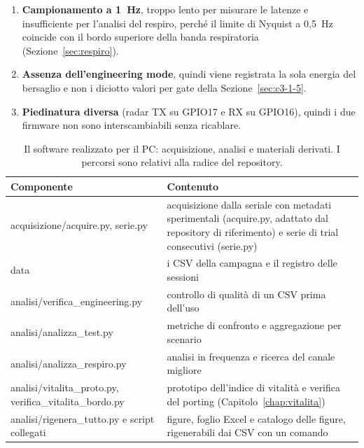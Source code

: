 \begin{enumerate}
  \item \textbf{Campionamento a 1~Hz}, troppo lento per misurare le latenze e insufficiente per l'analisi del respiro, perché il limite di Nyquist a 0,5~Hz coincide con il bordo superiore della banda respiratoria (Sezione~\ref{sec:respiro}).
  \item \textbf{Assenza dell'engineering mode}, quindi viene registrata la sola energia del bersaglio e non i diciotto valori per gate della Sezione~\ref{sec:c3-1-5}.
  \item \textbf{Piedinatura diversa} (radar TX su GPIO17 e RX su GPIO16), quindi i due firmware non sono interscambiabili senza ricablare.
\end{enumerate}

\begin{table}[!htb]
\centering
\caption{Il software realizzato per il PC: acquisizione, analisi e materiali derivati. I percorsi sono relativi alla radice del repository.}
\label{tab:c3-14b}
\small
\begin{tabularx}{\linewidth}{@{}>{\raggedright\arraybackslash}p{4.3cm}>{\raggedright\arraybackslash}X@{}}
\toprule
\textbf{Componente} & \textbf{Contenuto} \\
\midrule
acquisizione/acquire.py, serie.py & acquisizione dalla seriale con metadati sperimentali (acquire.py, adattato dal repository di riferimento) e serie di trial consecutivi (serie.py) \\
data & i CSV della campagna e il registro delle sessioni \\
analisi/verifica\_\allowbreak{}engineering.py & controllo di qualità di un CSV prima dell'uso \\
analisi/analizza\_\allowbreak{}test.py & metriche di confronto e aggregazione per scenario \\
analisi/analizza\_\allowbreak{}respiro.py & analisi in frequenza e ricerca del canale migliore \\
analisi/vitalita\_\allowbreak{}proto.py,\allowbreak{} verifica\_\allowbreak{}vitalita\_\allowbreak{}bordo.py & prototipo dell'indice di vitalità e verifica del porting (Capitolo~\ref{chap:vitalita}) \\
analisi/rigenera\_\allowbreak{}tutto.py e script collegati & figure, foglio Excel e catalogo delle figure, rigenerabili dai CSV con un comando \\
\bottomrule
\end{tabularx}
\end{table}

